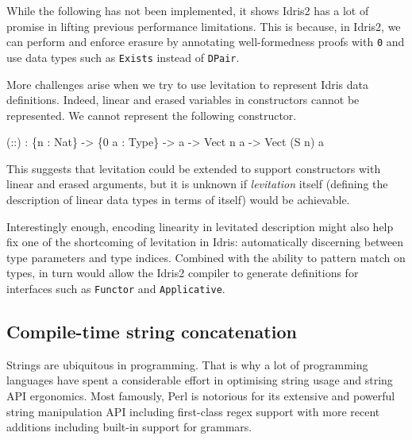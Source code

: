 \documentclass[
]{article}
\newenvironment{Shaded}{}{}
\newcommand{\DataTypeTok}[1]{\textcolor[rgb]{0.56,0.13,0.00}{#1}}
\newcommand{\DecValTok}[1]{\textcolor[rgb]{0.25,0.63,0.44}{#1}}
\newcommand{\NormalTok}[1]{#1}
\newcommand{\OperatorTok}[1]{\textcolor[rgb]{0.40,0.40,0.40}{#1}}
\newcommand{\OtherTok}[1]{\textcolor[rgb]{0.00,0.44,0.13}{#1}}
\begin{document}
While the following has not been implemented, it shows Idris2 has a lot
of promise in lifting previous performance limitations. This is because,
in Idris2, we can perform and enforce erasure by annotating
well-formedness proofs with \texttt{0} and use data types such as
\texttt{Exists} instead of \texttt{DPair}.

More challenges arise when we try to use levitation to represent Idris
data definitions. Indeed, linear and erased variables in constructors
cannot be represented. We cannot represent the following constructor.

\begin{Shaded}
\begin{Highlighting}[]
\NormalTok{(}\OtherTok{::}\NormalTok{) }\OperatorTok{:}\NormalTok{ \{n }\OperatorTok{:} \DataTypeTok{Nat}\NormalTok{\} }\OtherTok{{-}\textgreater{}}\NormalTok{ \{}\DecValTok{0}\NormalTok{ a }\OperatorTok{:} \DataTypeTok{Type}\NormalTok{\} }\OtherTok{{-}\textgreater{}}\NormalTok{ a }\OtherTok{{-}\textgreater{}} \DataTypeTok{Vect}\NormalTok{ n a }\OtherTok{{-}\textgreater{}} \DataTypeTok{Vect}\NormalTok{ (}\DataTypeTok{S}\NormalTok{ n) a }
\end{Highlighting}
\end{Shaded}

This suggests that levitation could be extended to support constructors
with linear and erased arguments, but it is unknown if \emph{levitation}
itself (defining the description of linear data types in terms of
itself) would be achievable.

Interestingly enough, encoding linearity in levitated description might
also help fix one of the shortcoming of levitation in Idris:
automatically discerning between type parameters and type indices.
Combined with the ability to pattern match on types, in turn would allow
the Idris2 compiler to generate definitions for interfaces such as
\texttt{Functor} and \texttt{Applicative}.

\hypertarget{compile-time-string-concatenation}{%
\subsection{Compile-time string
concatenation}\label{compile-time-string-concatenation}}

Strings are ubiquitous in programming. That is why a lot of programming
languages have spent a considerable effort in optimising string usage
and string API ergonomics. Most famously, Perl is notorious for its
extensive and powerful string manipulation API including first-class
regex support with more recent additions including built-in support for
grammars.
\end{document}
